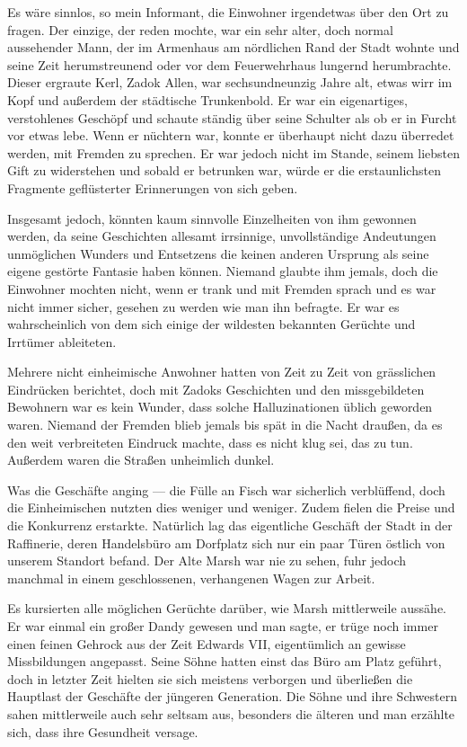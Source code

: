 Es wäre sinnlos, so mein Informant, die Einwohner irgendetwas über den Ort zu fragen. Der einzige, der reden mochte, war ein sehr alter, doch normal aussehender Mann, der im Armenhaus am nördlichen Rand der Stadt wohnte und seine Zeit herumstreunend oder vor dem Feuerwehrhaus lungernd herumbrachte. Dieser ergraute Kerl, Zadok Allen, war sechsundneunzig Jahre alt, etwas wirr im Kopf und außerdem der städtische Trunkenbold. Er war ein eigenartiges, verstohlenes Geschöpf und schaute ständig über seine Schulter als ob er in Furcht vor etwas lebe. Wenn er nüchtern war, konnte er überhaupt nicht dazu überredet werden, mit Fremden zu sprechen. Er war jedoch nicht im Stande, seinem liebsten Gift zu widerstehen und sobald er betrunken war, würde er die erstaunlichsten Fragmente geflüsterter Erinnerungen von sich geben.

Insgesamt jedoch, könnten kaum sinnvolle Einzelheiten von ihm gewonnen werden, da seine Geschichten allesamt irrsinnige, unvollständige Andeutungen unmöglichen Wunders und Entsetzens die keinen anderen Ursprung als seine eigene gestörte Fantasie haben können. Niemand glaubte ihm jemals, doch die Einwohner mochten nicht, wenn er trank und mit Fremden sprach und es war nicht immer sicher, gesehen zu werden wie man ihn befragte. Er war es wahrscheinlich von dem sich einige der wildesten bekannten Gerüchte und Irrtümer ableiteten.

Mehrere nicht einheimische Anwohner hatten von Zeit zu Zeit von grässlichen Eindrücken berichtet, doch mit Zadoks Geschichten und den missgebildeten Bewohnern war es kein Wunder, dass solche Halluzinationen üblich geworden waren. Niemand der Fremden blieb jemals bis spät in die Nacht draußen, da es den weit verbreiteten Eindruck machte, dass es nicht klug sei, das zu tun. Außerdem waren die Straßen unheimlich dunkel.

Was die Geschäfte anging --- die Fülle an Fisch war sicherlich verblüffend, doch die Einheimischen nutzten dies weniger und weniger. Zudem fielen die Preise und die Konkurrenz erstarkte. Natürlich lag das eigentliche Geschäft der Stadt in der Raffinerie, deren Handelsbüro am Dorfplatz sich nur ein paar Türen östlich von unserem Standort befand. Der Alte Marsh war nie zu sehen, fuhr jedoch manchmal in einem geschlossenen, verhangenen Wagen zur Arbeit.

Es kursierten alle möglichen Gerüchte darüber, wie Marsh mittlerweile aussähe. Er war einmal ein großer Dandy gewesen und man sagte, er trüge noch immer einen feinen Gehrock aus der Zeit Edwards VII, eigentümlich an gewisse Missbildungen angepasst. Seine Söhne hatten einst das Büro am Platz geführt, doch in letzter Zeit hielten sie sich meistens verborgen und überließen die Hauptlast der Geschäfte der jüngeren Generation. Die Söhne und ihre Schwestern sahen mittlerweile auch sehr seltsam aus, besonders die älteren und man erzählte sich, dass ihre Gesundheit versage.

